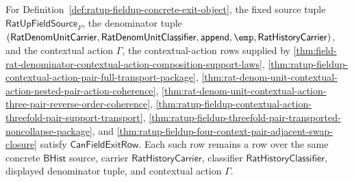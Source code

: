 \begin{theorem}
\label{thm:ratup-fieldup-canonical-exit-contextual-action-row-coverage}
For Definition~\ref{def:ratup-fieldup-concrete-exit-object}, the fixed source
tuple $\mathsf{RatUpFieldSource}_F$, the denominator tuple
$(\mathsf{RatDenomUnitCarrier},\mathsf{RatDenomUnitClassifier},
\mathsf{append},\emp,\mathsf{RatHistoryCarrier})$, and the contextual action
$\Gamma$, the contextual-action rows supplied by
\autoref{thm:field-rat-denominator-contextual-action-composition-support-laws},
\autoref{thm:ratup-fieldup-contextual-action-pair-full-transport-package},
\autoref{thm:rat-denom-unit-contextual-action-nested-pair-action-coherence},
\autoref{thm:rat-denom-unit-contextual-action-three-pair-reverse-order-coherence},
\autoref{thm:ratup-fieldup-contextual-action-threefold-pair-support-transport},
\autoref{thm:ratup-fieldup-threefold-pair-transported-noncollapse-package}, and
\autoref{thm:ratup-fieldup-four-context-pair-adjacent-swap-closure} satisfy
$\mathsf{CanFieldExitRow}$. Each such row remains a row over the same concrete
$\mathsf{BHist}$ source, carrier $\mathsf{RatHistoryCarrier}$, classifier
$\mathsf{RatHistoryClassifier}$, displayed denominator tuple, and contextual
action $\Gamma$.
\end{theorem}
